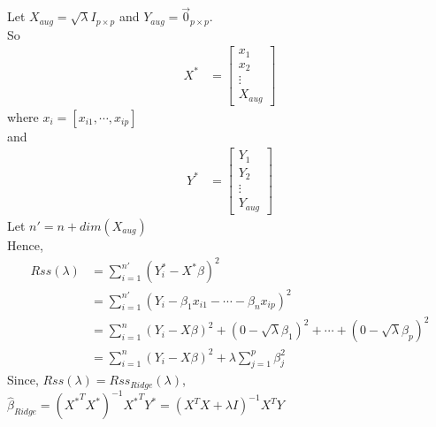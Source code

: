 \documentclass[12pt]{article}
\begin{document}
Let $X_{aug} = \sqrt{\lambda} I_{p \times p}$ and $Y_{aug} = \vec{0}_{p \times p}$.\\
So 
\begin{align*}
    X^* &= 
    \begin{bmatrix}
        x_{1} \\
       x_{2} \\
       \vdots \\
       X_{aug}
    \end{bmatrix}
\end{align*}
where $x_i = [x_{i1}, \cdots, x_{ip}]$\\
and 
\begin{align*}
    Y^* &= 
    \begin{bmatrix}
        Y_{1} \\
       Y_{2} \\
       \vdots \\
       Y_{aug}
    \end{bmatrix}
\end{align*}
Let $n' = n + dim(X_{aug})$\\
Hence, 
\begin{align*}
    Rss(\lambda) & = \sum_{i = 1}^{n'}(Y^*_i - X^* \beta)^2\\
    & = \sum_{i = 1}^{n'}(Y_i - \beta_1 x_{i1} - \cdots - \beta_n x_{ip})^2\\
    & = \sum_{i = 1}^{n}(Y_i - X \beta)^2 + (0 - \sqrt{\lambda} \beta_1)^2 + \cdots + (0 - \sqrt{\lambda} \beta_p)^2\\
    & = \sum_{i = 1}^{n}(Y_i - X \beta)^2 + \lambda \sum_{j = 1}^p \beta_j^2
\end{align*}
Since, $Rss(\lambda) = Rss_{Ridge}(\lambda)$, \\
$\hat \beta_{Ridge} = ({X^*}^T X^*)^{-1} {X^*}^T Y^* = ({X}^T X + \lambda I)^{-1} {X}^T Y$
\end{document}
